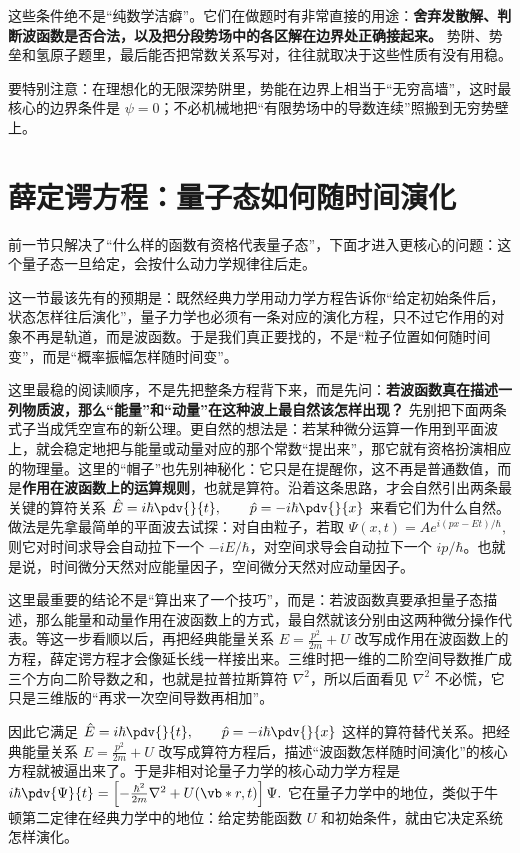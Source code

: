 \documentclass[lang=cn,11pt]{elegantbook}
\newcommand{\bridge}[1]{\begin{note}#1\end{note}}
\begin{document}
这些条件绝不是“纯数学洁癖”。它们在做题时有非常直接的用途：\textbf{舍弃发散解、判断波函数是否合法，以及把分段势场中的各区解在边界处正确接起来。} 势阱、势垒和氢原子题里，最后能否把常数关系写对，往往就取决于这些性质有没有用稳。

\begin{note}
要特别注意：在理想化的无限深势阱里，势能在边界上相当于“无穷高墙”，这时最核心的边界条件是 \(\psi=0\)；不必机械地把“有限势场中的导数连续”照搬到无穷势壁上。
\end{note}

\section{薛定谔方程：量子态如何随时间演化}

前一节只解决了“什么样的函数有资格代表量子态”，下面才进入更核心的问题：这个量子态一旦给定，会按什么动力学规律往后走。

这一节最该先有的预期是：既然经典力学用动力学方程告诉你“给定初始条件后，状态怎样往后演化”，量子力学也必须有一条对应的演化方程，只不过它作用的对象不再是轨道，而是波函数。于是我们真正要找的，不是“粒子位置如何随时间变”，而是“概率振幅怎样随时间变”。

这里最稳的阅读顺序，不是先把整条方程背下来，而是先问：\textbf{若波函数真在描述一列物质波，那么“能量”和“动量”在这种波上最自然该怎样出现？} 先别把下面两条式子当成凭空宣布的新公理。更自然的想法是：若某种微分运算一作用到平面波上，就会稳定地把与能量或动量对应的那个常数“提出来”，那它就有资格扮演相应的物理量。这里的“帽子”也先别神秘化：它只是在提醒你，这不再是普通数值，而是\textbf{作用在波函数上的运算规则}，也就是算符。沿着这条思路，才会自然引出两条最关键的算符关系
 \(\hat E=i\hbar\pdv{}{t}, \qquad \hat p=-i\hbar\pdv{}{x}\) 
来看它们为什么自然。做法是先拿最简单的平面波去试探：对自由粒子，若取
 \(\Psi(x,t)=A e^{i(px-Et)/\hbar},\) 
则它对时间求导会自动拉下一个 \(-iE/\hbar\)，对空间求导会自动拉下一个 \(ip/\hbar\)。也就是说，时间微分天然对应能量因子，空间微分天然对应动量因子。\bridge{这里最重要的结论不是“算出来了一个技巧”，而是：若波函数真要承担量子态描述，那么能量和动量作用在波函数上的方式，最自然就该分别由这两种微分操作代表。等这一步看顺以后，再把经典能量关系 \(E=\frac{p^2}{2m}+U\) 改写成作用在波函数上的方程，薛定谔方程才会像延长线一样接出来。三维时把一维的二阶空间导数推广成三个方向二阶导数之和，也就是拉普拉斯算符 \(\nabla^2\)，所以后面看见 \(\nabla^2\) 不必慌，它只是三维版的“再求一次空间导数再相加”。} 因此它满足
 \(\hat E=i\hbar\pdv{}{t}, \qquad \hat p=-i\hbar\pdv{}{x}\) 
这样的算符替代关系。把经典能量关系
 \(E=\frac{p^2}{2m}+U\) 
改写成算符方程后，描述“波函数怎样随时间演化”的核心方程就被逼出来了。于是非相对论量子力学的核心动力学方程是
 \(i\hbar\pdv{\Psi}{t} =\left[-\frac{\hbar^2}{2m}\nabla^2+U(\vb*{r},t)\right]\Psi.\) 
它在量子力学中的地位，类似于牛顿第二定律在经典力学中的地位：给定势能函数 \(U\) 和初始条件，就由它决定系统怎样演化。
\end{document}
